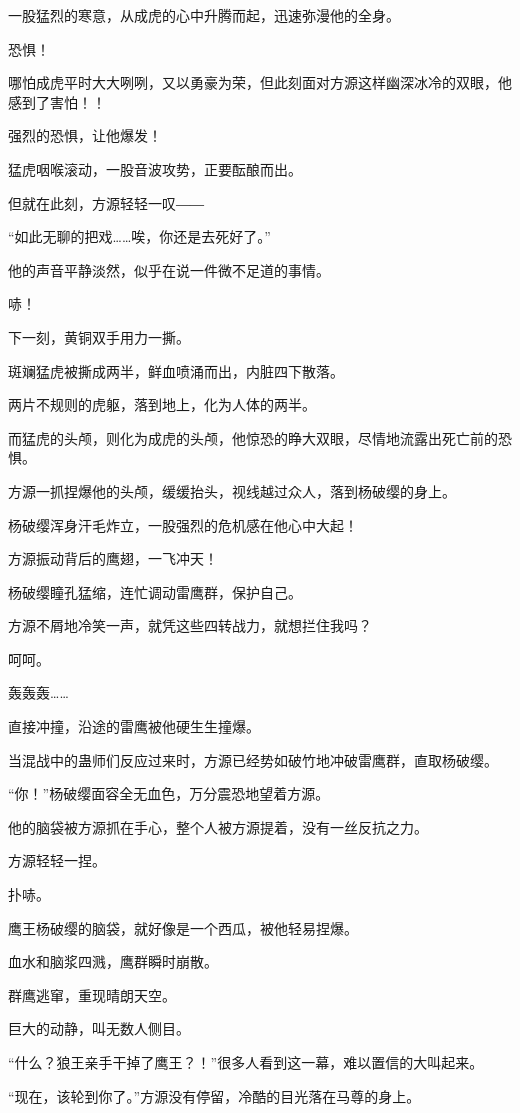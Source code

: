 \begin{this_body}
一股猛烈的寒意，从成虎的心中升腾而起，迅速弥漫他的全身。

恐惧！

哪怕成虎平时大大咧咧，又以勇豪为荣，但此刻面对方源这样幽深冰冷的双眼，他感到了害怕！！

强烈的恐惧，让他爆发！

猛虎咽喉滚动，一股音波攻势，正要酝酿而出。

但就在此刻，方源轻轻一叹――

“如此无聊的把戏……唉，你还是去死好了。”

他的声音平静淡然，似乎在说一件微不足道的事情。

哧！

下一刻，黄铜双手用力一撕。

斑斓猛虎被撕成两半，鲜血喷涌而出，内脏四下散落。

两片不规则的虎躯，落到地上，化为人体的两半。

而猛虎的头颅，则化为成虎的头颅，他惊恐的睁大双眼，尽情地流露出死亡前的恐惧。

方源一抓捏爆他的头颅，缓缓抬头，视线越过众人，落到杨破缨的身上。

杨破缨浑身汗毛炸立，一股强烈的危机感在他心中大起！

方源振动背后的鹰翅，一飞冲天！

杨破缨瞳孔猛缩，连忙调动雷鹰群，保护自己。

方源不屑地冷笑一声，就凭这些四转战力，就想拦住我吗？

呵呵。

轰轰轰……

直接冲撞，沿途的雷鹰被他硬生生撞爆。

当混战中的蛊师们反应过来时，方源已经势如破竹地冲破雷鹰群，直取杨破缨。

“你！”杨破缨面容全无血色，万分震恐地望着方源。

他的脑袋被方源抓在手心，整个人被方源提着，没有一丝反抗之力。

方源轻轻一捏。

扑哧。

鹰王杨破缨的脑袋，就好像是一个西瓜，被他轻易捏爆。

血水和脑浆四溅，鹰群瞬时崩散。

群鹰逃窜，重现晴朗天空。

巨大的动静，叫无数人侧目。

“什么？狼王亲手干掉了鹰王？！”很多人看到这一幕，难以置信的大叫起来。

“现在，该轮到你了。”方源没有停留，冷酷的目光落在马尊的身上。


\end{this_body}
